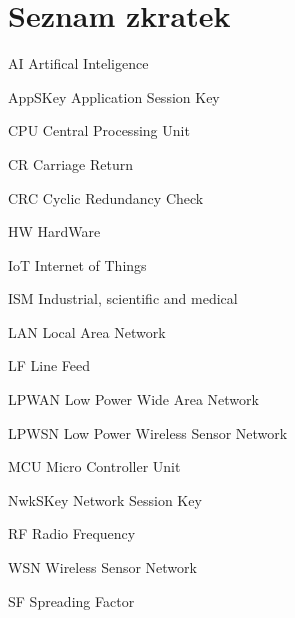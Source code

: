 \documentclass[oneside]{ctuthesis}
\theoremstyle{plain}
\theoremstyle{definition}
\theoremstyle{note}
\newcommand{\abbrlabel}[1]{\makebox[3cm][l]{\textbf{#1}\ \dotfill}}
\newenvironment{abbreviations}{\begin{list}{}{\renewcommand{\makelabel}{\abbrlabel}}}{\end{list}}
\begin{document}
\section{Seznam zkratek}
\begin{abbreviations}
	\item[AI]		Artifical Inteligence
	\item[AppSKey]	Application Session Key	
	\item[CPU]		Central Processing Unit
	\item[CR] 			Carriage Return
	\item[CRC] 			Cyclic Redundancy Check
	\item[HW]			HardWare
	\item[IoT] 		Internet of Things
	\item[ISM]		Industrial, scientific and medical 
	\item[LAN]		Local Area Network
	\item[LF]		Line Feed 
	\item[LPWAN]   	Low Power Wide Area Network 
	\item[LPWSN] 	Low Power Wireless Sensor Network	
	\item[MCU] 		Micro Controller Unit
	\item[NwkSKey]	Network Session Key
	\item[RF]		Radio Frequency
	\item[WSN]		Wireless Sensor Network

	\item[SF]		Spreading Factor
\end{abbreviations}


% 		

													
\end{document}
